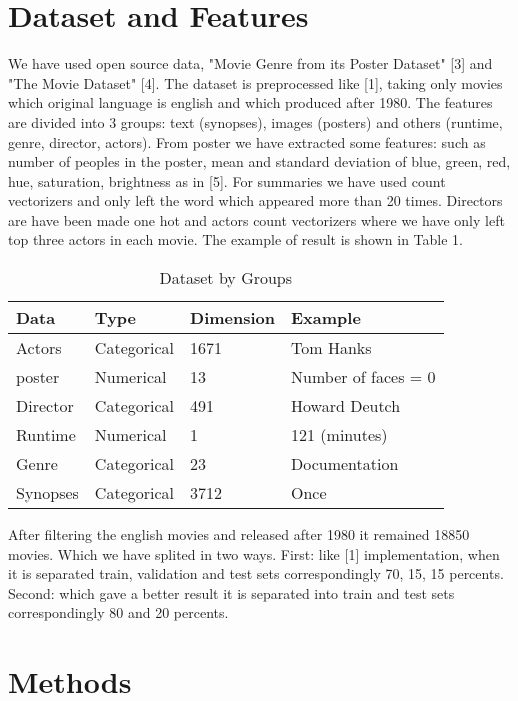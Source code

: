 \documentclass{article}
\begin{document}
\section{Dataset and Features}
\label{headings}

We have used open source data, "Movie Genre from its Poster Dataset" [3] and "The Movie Dataset" [4]. The dataset is preprocessed like [1], taking only movies which original language is english and which produced after 1980. The features are divided into 3 groups: text (synopses), images (posters) and others (runtime, genre, director, actors). From poster we have extracted some features: such as number of peoples in the poster, mean and standard deviation of blue, green, red, hue, saturation, brightness as in [5]. For summaries we have used count vectorizers and only left the word which appeared more than 20 times. Directors are have been made one hot and actors count vectorizers where we have only left top three actors in each movie. The example of result is shown in Table 1. 

\begin{table}
  \caption{Dataset by Groups}
  \label{dataset-table}
  \centering
  \begin{tabular}{llll}
    \toprule
    Data & Type & Dimension & Example  \\
    \midrule
    Actors & Categorical  & 1671 &  Tom Hanks   \\
    poster & Numerical & 13 & Number of faces = 0 \\
    Director & Categorical & 491 & Howard Deutch \\
    Runtime & Numerical & 1 & 121 (minutes) \\
    Genre & Categorical & 23 & Documentation \\
    Synopses & Categorical & 3712 & Once \\
    \bottomrule
  \end{tabular}
\end{table}
After filtering the english movies and released after 1980 it remained 18850 movies. Which we have splited in two ways. First: like [1] implementation, when it is separated train, validation and test sets correspondingly 70, 15, 15 percents. Second: which gave a better result it is separated into train and test sets correspondingly 80 and 20 percents. 

\section{Methods}
\label{methods}
\end{document}
